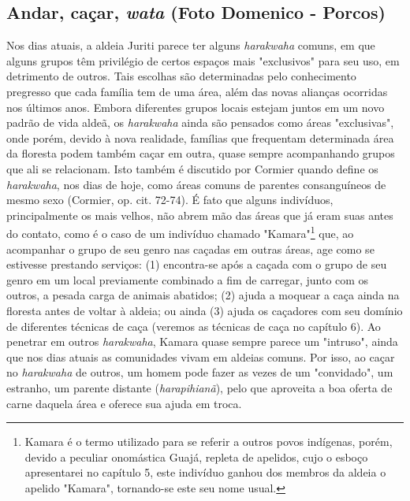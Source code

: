 \hypertarget{andar-cauxe7ar-wata-foto-domenico---porcos}{%
\subsection{\texorpdfstring{Andar, caçar, \emph{wata} (Foto Domenico -
Porcos)}{Andar, caçar, wata (Foto Domenico - Porcos)}}\label{andar-cauxe7ar-wata-foto-domenico---porcos}}

Nos dias atuais, a aldeia Juriti parece ter alguns \emph{harakwaha}
comuns, em que alguns grupos têm privilégio de certos espaços mais
"exclusivos" para seu uso, em detrimento de outros. Tais escolhas são
determinadas pelo conhecimento pregresso que cada família tem de uma
área, além das novas alianças ocorridas nos últimos anos. Embora
diferentes grupos locais estejam juntos em um novo padrão de vida aldeã,
os \emph{harakwaha} ainda são pensados como áreas "exclusivas", onde
porém, devido à nova realidade, famílias que frequentam determinada área
da floresta podem também caçar em outra, quase sempre acompanhando
grupos que ali se relacionam. Isto também é discutido por Cormier quando
define os \emph{harakwaha}, nos dias de hoje, como áreas comuns de
parentes consanguíneos de mesmo sexo (Cormier, op. cit. 72-74). É fato
que alguns indivíduos, principalmente os mais velhos, não abrem mão das
áreas que já eram suas antes do contato, como é o caso de um indivíduo
chamado "Kamara"\footnote{Kamara é o termo utilizado para se referir a
  outros povos indígenas, porém, devido a peculiar onomástica Guajá,
  repleta de apelidos, cujo o esboço apresentarei no capítulo 5, este
  indivíduo ganhou dos membros da aldeia o apelido "Kamara", tornando-se
  este seu nome usual.} que, ao acompanhar o grupo de seu genro nas
caçadas em outras áreas, age como se estivesse prestando serviços: (1)
encontra-se após a caçada com o grupo de seu genro em um local
previamente combinado a fim de carregar, junto com os outros, a pesada
carga de animais abatidos; (2) ajuda a moquear a caça ainda na floresta
antes de voltar à aldeia; ou ainda (3) ajuda os caçadores com seu
domínio de diferentes técnicas de caça (veremos as técnicas de caça no
capítulo 6). Ao penetrar em outros \emph{harakwaha}, Kamara quase sempre
parece um "intruso", ainda que nos dias atuais as comunidades vivam em
aldeias comuns. Por isso, ao caçar no \emph{harakwaha} de outros, um
homem pode fazer as vezes de um "convidado", um estranho, um parente
distante (\emph{harapihianã}), pelo que aproveita a boa oferta de carne
daquela área e oferece sua ajuda em troca.

